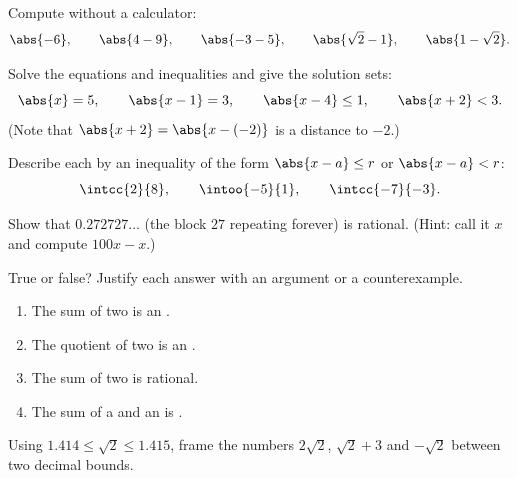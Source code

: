 \begin{exercise}[$\star$]\label{exo:g10:numbers:4}
Compute without a calculator:
\[
\abs{-6}, \qquad \abs{4 - 9}, \qquad \abs{-3 - 5}, \qquad
\abs{\sqrt 2 - 1}, \qquad \abs{1 - \sqrt 2}.
\]
\end{exercise}

\begin{exercise}[$\star$]\label{exo:g10:numbers:5}
Solve the equations and inequalities and give the solution sets:
\[
\abs{x} = 5, \qquad \abs{x - 1} = 3, \qquad \abs{x - 4} \leq 1, \qquad
\abs{x + 2} < 3 .
\]
(Note that $\abs{x+2} = \abs{x - (-2)}$ is a distance to $-2$.)
\end{exercise}

\begin{exercise}[$\star\star$]\label{exo:g10:numbers:6}
Describe each  by an inequality of the form
$\abs{x - a} \leq r$ or $\abs{x - a} < r$:
\[
\intcc{2}{8}, \qquad \intoo{-5}{1}, \qquad \intcc{-7}{-3}.
\]
\end{exercise}

\begin{exercise}[$\star\star$]\label{exo:g10:numbers:7}
Show that $0.272727\dots$ (the block $27$ repeating forever) is rational.
(Hint: call it $x$ and compute $100x - x$.)
\end{exercise}

\begin{exercise}[$\star\star$]\label{exo:g10:numbers:8}
True or false? Justify each answer with an argument or a counterexample.
\begin{enumerate}
  \item The sum of two  is an .
  \item The quotient of two  is an .
  \item The sum of two  is rational.
  \item The sum of a  and an  is
        .
\end{enumerate}
\end{exercise}

\begin{exercise}[$\star\star$]\label{exo:g10:numbers:9}
Using $1.414 \leq \sqrt 2 \leq 1.415$, frame the numbers $2\sqrt2$,
$\sqrt2 + 3$ and $-\sqrt2$ between two decimal bounds.
\end{exercise}


